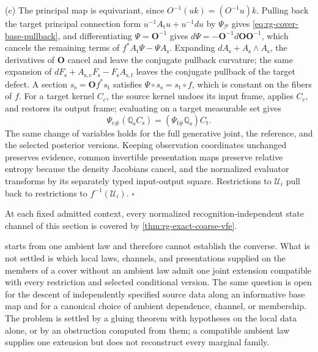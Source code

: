 (c) The principal map is equivariant, since
\(O^{-1}(uk)=(O^{-1}u)k\). Pulling back the target principal connection form
\(u^{-1}A_{\mathrm t}u+u^{-1}du\) by \(\Psi_{\mathscr P}\) gives
\eqref{eq:rg-cover-base-pullback}, and differentiating \(\Psi=\mathbf O^{-1}\)
gives \(d\Psi=-\mathbf O^{-1}d\mathbf O\mathbf O^{-1}\), which cancels the
remaining terms of \(f^*A_{\mathrm t}\Psi-\Psi A_{\mathrm s}\). Expanding
\(dA_{\mathrm s}+A_{\mathrm s}\wedge A_{\mathrm s}\), the derivatives of
\(\mathbf O\) cancel and leave the conjugate pullback curvature; the same
expansion of \(dF_{\mathrm s}+A_{\mathrm s,\mathrm c}F_{\mathrm s}-F_{\mathrm s}A_{\mathrm s,\mathrm f}\)
leaves the conjugate pullback of the target defect. A section
\(s_{\mathrm s}=\mathbf O f^*s_{\mathrm t}\) satisfies
\(\Psi\circ s_{\mathrm s}=s_{\mathrm t}\circ f\), which is constant on the fibers
of \(f\). For a target kernel \(C_c\), the source kernel undoes its input frame,
applies \(C_c\), and restores its output frame; evaluating on a target measurable
set gives
\begin{equation}
 \Psi_{\mathrm c\#}(\mathbb Q_{\mathrm s}C_{\mathrm s})
 =(\Psi_{\mathrm f\#}\mathbb Q_{\mathrm s})C_{\mathrm t}.
\label{eq:rg-cover-base-channel-square}
\end{equation}
The same change of variables holds for the full generative joint, the reference,
and the selected posterior versions. Keeping observation coordinates unchanged
preserves evidence, common invertible presentation maps preserve relative entropy
because the density Jacobians cancel, and the normalized evaluator transforms by
its separately typed input-output square. Restrictions to \(\mathcal U_i\) pull
back to restrictions to \(f^{-1}(\mathcal U_i)\). \(\square\)

At each fixed admitted context, every normalized recognition-independent state
channel of this section is covered by \cref{thm:rg-exact-coarse-vfe}.

 starts from one ambient law and therefore
cannot establish the converse. What is not settled is which local laws, channels,
and presentations supplied on the members of a cover without an ambient law admit
one joint extension compatible with every restriction and selected conditional
version. The same question is open for the descent of independently specified
source data along an informative base map and for a canonical choice of ambient
dependence, channel, or membership. The problem is settled by a gluing theorem
with hypotheses on the local data alone, or by an obstruction computed from them;
a compatible ambient law supplies one extension but does not reconstruct every
marginal family.

